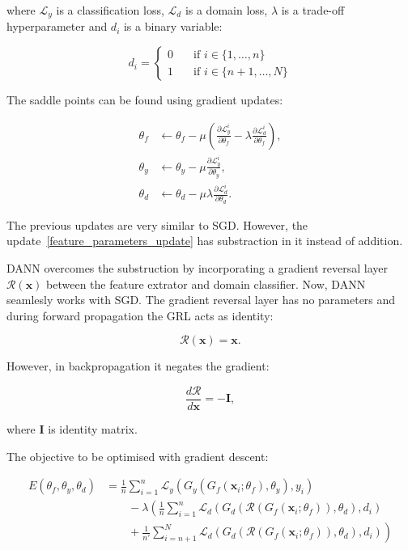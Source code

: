where \(\mathcal{L}_y\) is a classification loss,
\(\mathcal{L}_d\) is a domain loss,
\(\lambda\) is a trade-off hyperparameter
and \(d_i\) is a binary variable:

\begin{equation}
	d_i =
	\begin{cases}
		0 & \quad \text{if } i \in \{1, \dots, n\} \\
		1 & \quad \text{if } i \in \{n + 1, \dots, N\}
	\end{cases}
\end{equation}

The saddle points can be found using gradient updates:

\begin{align}
	\theta_f &\gets \theta_f - \mu \left(
	\frac{\partial \mathcal{L}_y^i}{\partial \theta_f}
	- \lambda \frac{\partial \mathcal{L}_d^i}{\partial \theta_f}
	\right),
	\label{feature_parameters_update} \\
	\theta_y &\gets \theta_y - \mu
	\frac{\partial \mathcal{L}_y^i}{\partial \theta_y}, \\
	\theta_d &\gets \theta_d - \mu \lambda
	\frac{\partial \mathcal{L}_d^i}{\partial \theta_d}.
\end{align}

The previous updates are very similar to SGD.
However, the update~\ref{feature_parameters_update} has substraction in it instead of addition.

DANN overcomes the substruction by incorporating a gradient reversal layer \(\mathcal{R}(\mathbf{x})\) between the feature extrator and domain classifier.
Now, DANN seamlesly works with SGD.
The gradient reversal layer has no parameters
and during forward propagation the GRL acts as identity:

\begin{equation}
	\mathcal{R}(\mathbf{x}) = \mathbf{x}.
\end{equation}

However, in backpropagation it negates the gradient:

\begin{equation}
	\frac{d \mathcal{R}}{d \mathbf{x}} = -\mathbf{I},
\end{equation}

where \(\mathbf{I}\) is identity matrix.

The objective to be optimised with gradient descent:

\begin{align}
	E(\theta_f, \theta_y, \theta_d) &= \frac{1}{n} \sum^{n}_{i = 1} \mathcal{L}_y(G_y(G_f(\mathbf{x}_i; \theta_f), \theta_y), y_i) \nonumber \\
	&\qquad {} - \lambda \left(\frac{1}{n} \sum^{n}_{i = 1} \mathcal{L}_d(G_d(\mathcal{R}(G_f(\mathbf{x}_i; \theta_f)), \theta_d), d_i) \right. \nonumber \\
	&\qquad \left. {} + \frac{1}{n'} \sum^{N}_{i = n + 1} \mathcal{L}_d(G_d(\mathcal{R}(G_f(\mathbf{x}_i; \theta_f)), \theta_d), d_i)\right)
	\label{dann_loss}
\end{align}

